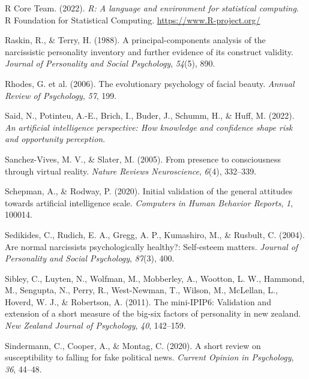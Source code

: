 \documentclass[
  man,floatsintext]{apa6}
\newlength{\cslhangindent}
\newlength{\cslentryspacingunit} %
\newenvironment{CSLReferences}[2] %
 {%
  \setlength{\parindent}{0pt}
  \ifodd #1
  \let\oldpar\par
  \def\par{\hangindent=\cslhangindent\oldpar}
  \fi
  \setlength{\parskip}{#2\cslentryspacingunit}
 }%
 {}
\begin{document}
\begin{CSLReferences}{1}{0}
\leavevmode{}%
R Core Team. (2022). \emph{R: A language and environment for statistical computing}. R Foundation for Statistical Computing. \url{https://www.R-project.org/}

\leavevmode{}%
Raskin, R., \& Terry, H. (1988). A principal-components analysis of the narcissistic personality inventory and further evidence of its construct validity. \emph{Journal of Personality and Social Psychology}, \emph{54}(5), 890.

\leavevmode{}%
Rhodes, G. et al. (2006). The evolutionary psychology of facial beauty. \emph{Annual Review of Psychology}, \emph{57}, 199.

\leavevmode{}%
Said, N., Potinteu, A.-E., Brich, I., Buder, J., Schumm, H., \& Huff, M. (2022). \emph{An artificial intelligence perspective: How knowledge and confidence shape risk and opportunity perception}.

\leavevmode{}%
Sanchez-Vives, M. V., \& Slater, M. (2005). From presence to consciousness through virtual reality. \emph{Nature Reviews Neuroscience}, \emph{6}(4), 332--339.

\leavevmode{}%
Schepman, A., \& Rodway, P. (2020). Initial validation of the general attitudes towards artificial intelligence scale. \emph{Computers in Human Behavior Reports}, \emph{1}, 100014.

\leavevmode{}%
Sedikides, C., Rudich, E. A., Gregg, A. P., Kumashiro, M., \& Rusbult, C. (2004). Are normal narcissists psychologically healthy?: Self-esteem matters. \emph{Journal of Personality and Social Psychology}, \emph{87}(3), 400.

\leavevmode{}%
Sibley, C., Luyten, N., Wolfman, M., Mobberley, A., Wootton, L. W., Hammond, M., Sengupta, N., Perry, R., West-Newman, T., Wilson, M., McLellan, L., Hoverd, W. J., \& Robertson, A. (2011). The mini-IPIP6: Validation and extension of a short measure of the big-six factors of personality in new zealand. \emph{New Zealand Journal of Psychology}, \emph{40}, 142--159.

\leavevmode{}%
Sindermann, C., Cooper, A., \& Montag, C. (2020). A short review on susceptibility to falling for fake political news. \emph{Current Opinion in Psychology}, \emph{36}, 44--48.


\end{CSLReferences}
\end{document}
